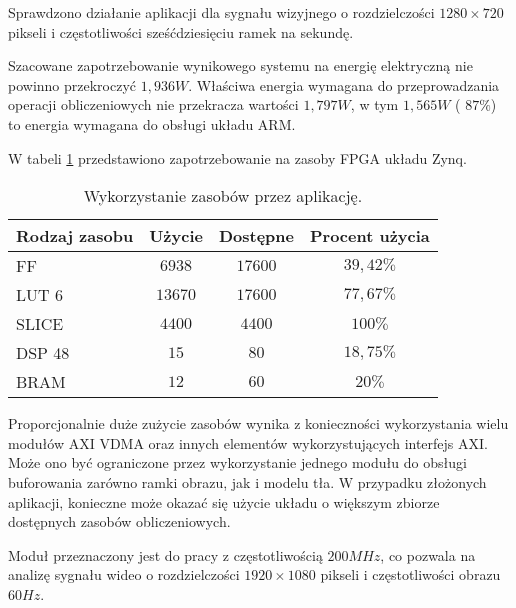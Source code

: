 Sprawdzono działanie aplikacji dla sygnału wizyjnego o rozdzielczości $1280 \times 720$ pikseli i częstotliwości sześćdziesięciu ramek na sekundę.

Szacowane zapotrzebowanie wynikowego systemu na energię elektryczną nie powinno przekroczyć $1,936W$. Właściwa energia wymagana do przeprowadzania operacji obliczeniowych nie przekracza wartości $1,797W$, w tym $1,565W$ ( $87\%$) to energia wymagana do obsługi układu ARM.


W tabeli \ref{tab;background-model-utilization} przedstawiono zapotrzebowanie na zasoby FPGA układu Zynq.

\begin{table}[h]
	\caption{Wykorzystanie zasobów przez aplikację.}
	\centering
	\label{tab;background-model-utilization}
	\begin{tabular}{|l|c|c|c|}
		\hline
		\textbf{Rodzaj zasobu} & \textbf{Użycie} & \textbf{Dostępne} & \textbf{Procent użycia}      \\ \hline
		FF                     & $6938$            & $17600$             & $39,42\%$                 \\ \hline
		LUT 6                  & $13670$            & $17600$             & $77,67\%$                 \\ \hline
		SLICE                  & $4400$            & $4400$             & $100\%$                 \\ \hline
		DSP 48                 & $15$               & $80$                & $18,75\%$                    \\ \hline
		BRAM                   & $12$               & $60$                & $20\%$                   \\ \hline
	\end{tabular}
\end{table}

Proporcjonalnie duże zużycie zasobów wynika z konieczności wykorzystania wielu modułów AXI VDMA oraz innych elementów wykorzystujących interfejs AXI. 
Może ono być ograniczone przez wykorzystanie jednego modułu do obsługi buforowania zarówno ramki obrazu, jak i modelu tła. 
W przypadku złożonych aplikacji, konieczne może okazać się użycie układu o większym zbiorze dostępnych zasobów obliczeniowych. %

Moduł przeznaczony jest do pracy z częstotliwością $200MHz$, co pozwala na analizę sygnału wideo o rozdzielczości $1920 \times 1080$ pikseli i częstotliwości obrazu $60Hz$.

